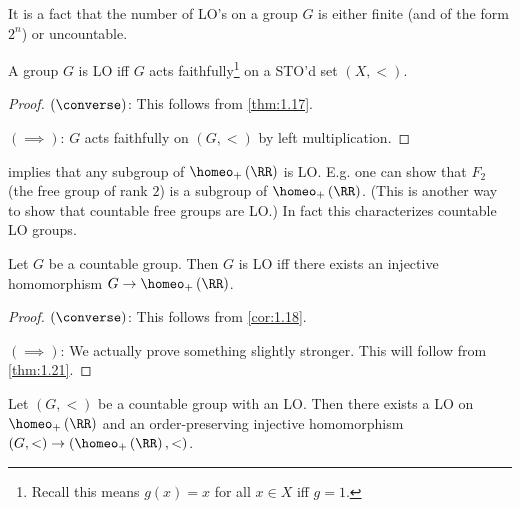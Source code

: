 \begin{rmk}
It is a fact that the number of LO's on a group $G$ is either finite (and of the form
$2^n$) or uncountable.
\end{rmk}

\begin{cor}
A group $G$ is LO iff $G$ acts faithfully\footnote{Recall this means $g\left(x\right)= x$
for all $x\in X$ iff $g = 1$.} on a STO'd set $\left(X , <\right)$.
\end{cor}

\begin{proof}
$\left(\converse\right)$: This follows from \cref{thm:1.17}.

$\left(\implies\right)$: $G$ acts faithfully on $\left(G , <\right)$ by left
multiplication.
\end{proof}

 implies that any subgroup of $\homeo_+\left(\RR\right)$ is LO. 
E.g. one can show that $F_2$ (the free group of rank $2$) is a subgroup of
$\homeo_+\left(\RR\right)$.
(This is another way to show that countable free groups are LO.)
In fact this characterizes countable LO groups.

\begin{thm}
Let $G$ be a countable group. 
Then $G$ is LO iff there exists an injective homomorphism $G\to \homeo_+\left(\RR\right)$.
\label{thm:1.20}
\end{thm}

\begin{proof}
$\left(\converse\right)$: This follows from \cref{cor:1.18}.

$\left(\implies\right)$: We actually prove something slightly stronger. This will follow
from \cref{thm:1.21}.
\end{proof}

\begin{thm}
Let $\left(G , <\right)$ be a countable group with an LO. Then there exists a LO on
$\homeo_+\left(\RR\right)$ and an order-preserving injective homomorphism
$\left(G , <\right)\to \left(\homeo_+\left(\RR\right) , <\right)$.
\label{thm:1.21}
\end{thm}

